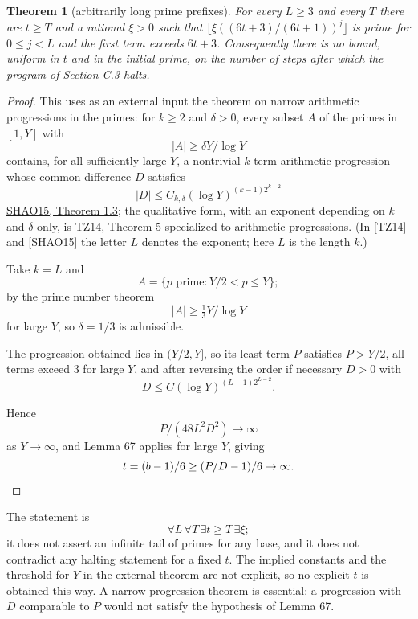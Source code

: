 \documentclass[11pt,reqno]{amsart}
\newtheorem{theorem}{Theorem}
\theoremstyle{definition}
\theoremstyle{remark}
\begin{document}
\begin{samepage}
\begin{theorem}[arbitrarily long prime prefixes]\leavevmode\label{thm:68}
For every \(L\ge3\)
and every \(T\) there are \(t\ge T\) and a rational \(\xi>0\) such that
\(\lfloor\xi((6t+3)/(6t+1))^j\rfloor\) is prime for \(0\le j<L\) and
the first term exceeds \(6t+3\). Consequently there is no bound, uniform
in \(t\) and in the initial prime, on the number of steps after which
the program of Section C.3 halts.
\label{thm-end:68}
\end{theorem}
\end{samepage}

\begin{proof}\leavevmode\label{proof:68}
This uses as an external input the theorem on narrow
arithmetic progressions in the primes: for \(k\ge2\) and \(\delta>0\),
every subset \(A\) of the primes in \([1,Y]\) with
\[
|A|\ge\delta Y/\log Y
\]
contains, for all sufficiently large \(Y\), a
nontrivial \(k\)-term arithmetic progression whose common difference
\(D\) satisfies
\[
|D|\le C_{k,\delta}(\log Y)^{(k-1)2^{k-2}}
\]
\hyperref[ref-shao15]{SHAO15, Theorem 1.3}; the qualitative form, with an
exponent depending on \(k\) and \(\delta\) only, is
\hyperref[ref-tz14]{TZ14, Theorem 5} specialized to arithmetic progressions.
(In {[}TZ14{]} and {[}SHAO15{]} the letter \(L\) denotes the exponent; here
\(L\) is the length \(k\).)

Take \(k=L\) and
\[
A=\{p\text{ prime}:Y/2<p\le Y\};
\]
by the prime number theorem
\[
|A|\ge\tfrac13Y/\log Y
\]
for large \(Y\), so \(\delta=1/3\) is
admissible.

The progression obtained lies in \((Y/2,Y]\), so its least
term \(P\) satisfies \(P>Y/2\), all terms exceed \(3\) for large \(Y\),
and after reversing the order if necessary \(D>0\) with
\[
D\le C(\log Y)^{(L-1)2^{L-2}}.
\]

Hence
\[
P/(48L^2D^2)\to\infty
\]
as
\(Y\to\infty\), and Lemma 67 applies for large \(Y\), giving
\[
t=(b-1)/6\ge(P/D-1)/6\to\infty.\qedhere
\]
\end{proof}

The statement is
\[
\forall L\,\forall T\,\exists t\ge T\,\exists\xi;
\]
it does not assert an infinite tail of primes for any base, and it does
not contradict any halting statement for a fixed \(t\). The implied
constants and the threshold for \(Y\) in the external theorem are not
explicit, so no explicit \(t\) is obtained this way. A narrow-progression
theorem is essential: a progression with \(D\) comparable to \(P\) would
not satisfy the hypothesis of Lemma 67.
\end{document}
